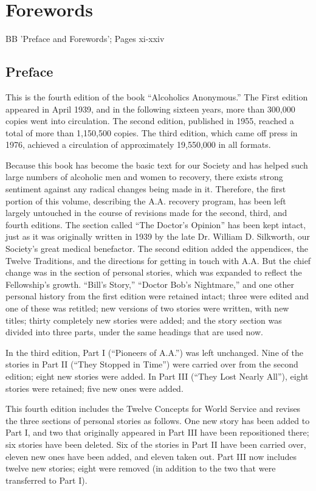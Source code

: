 \chapter{Forewords}

BB 'Preface and Forewords'; Pages xi-xxiv

\section{Preface}

This is the fourth edition of the book “Alcoholics Anonymous.”
The First edition appeared in April 1939, and in the following sixteen years, more than 300,000 copies went into circulation.
The second edition, published in 1955, reached a total of more than 1,150,500 copies.
The third edition, which came off press in 1976, achieved a circulation of approximately 19,550,000 in all formats.

Because this book has become the basic text for our Society and has helped such large numbers of alcoholic men and women to recovery, there exists strong sentiment against any radical changes being made in it.
Therefore, the first portion of this volume, describing the A.A. recovery program, has been left largely untouched in the course of revisions made for the second, third, and fourth editions.
The section called “The Doctor’s Opinion” has been kept intact, just as it was originally written in 1939 by the late Dr. William D. Silkworth, our Society’s great medical benefactor.
The second edition added the appendices, the Twelve Traditions, and the directions for getting in touch with A.A.
But the chief change was in the section of personal stories, which was expanded to reflect the Fellowship’s growth.
“Bill’s Story,” “Doctor Bob’s Nightmare,” and one other personal history from the first edition were retained intact; 
three were edited and one of these was retitled; 
new versions of two stories were written, with new titles; 
thirty completely new stories were added; 
and the story section was divided into three parts, under the same headings that are used now.

In the third edition, Part I (“Pioneers of A.A.”) was left unchanged.
Nine of the stories in Part II (“They Stopped in Time”) were carried over from the second edition; 
eight new stories were added.
In Part III (“They Lost Nearly All”), eight stories were retained; five new ones were added. 

This fourth edition includes the Twelve Concepts for World Service and revises the three sections of personal stories as follows.
One new story has been added to Part I, and two that originally appeared in Part III have been repositioned there; 
six stories have been deleted.
Six of the stories in Part II have been carried over, eleven new ones have been added, and eleven taken out.
Part III now includes twelve new stories; 
eight were removed (in addition to the two that were transferred to Part I).

